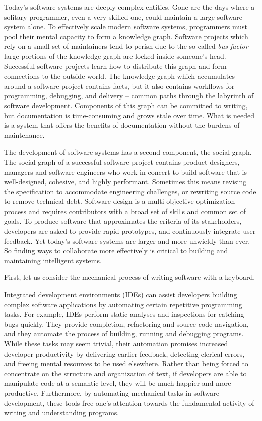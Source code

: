 \documentclass[12pt,initial,twoside,maitrise]{dms}
\numberwithin{equation}{section}
\numberwithin{table}{chapter}
\numberwithin{figure}{chapter}
\begin{document}
Today's software systems are deeply complex entities. Gone are the days where a solitary programmer, even a very skilled one, could maintain a large software system alone. To effectively scale modern software systems, programmers must pool their mental capacity to form a knowledge graph. Software projects which rely on a small set of maintainers tend to perish due to the so-called \textit{bus factor}~\citep{cosentino2015assessing} -- large portions of the knowledge graph are locked inside someone's head. Successful software projects learn how to distribute this graph and form connections to the outside world. The knowledge graph which accumulates around a software project contains facts, but it also contains workflows for programming, debugging, and delivery -- common paths through the labyrinth of software development. Components of this graph can be committed to writing, but documentation is time-consuming and grows stale over time. What is needed is a system that offers the benefits of documentation without the burdens of maintenance.

The development of software systems has a second component, the social graph. The social graph of a successful software project contains product designers, managers and software engineers who work in concert to build software that is well-designed, cohesive, and highly performant. Sometimes this means revising the specification to accommodate engineering challenges, or rewriting source code to remove technical debt. Software design is a multi-objective optimization process and requires contributors with a broad set of skills and common set of goals. To produce software that approximates the criteria of its stakeholders, developers are asked to provide rapid prototypes, and continuously integrate user feedback. Yet today's software systems are larger and more unwieldy than ever. So finding ways to collaborate more effectively is critical to building and maintaining intelligent systems.

First, let us consider the mechanical process of writing software with a keyboard.

Integrated development environments (IDEs) can assist developers building complex software applications by automating certain repetitive programming tasks. For example, IDEs perform static analyses and inspections for catching bugs quickly. They provide completion, refactoring and source code navigation, and they automate the process of building, running and debugging programs. While these tasks may seem trivial, their automation promises increased developer productivity by delivering earlier feedback, detecting clerical errors, and freeing mental resources to be used elsewhere. Rather than being forced to concentrate on the structure and organization of text, if developers are able to manipulate code at a semantic level, they will be much happier and more productive. Furthermore, by automating mechanical tasks in software development, these tools free one's attention towards the fundamental activity of writing and understanding programs.
\end{document}
